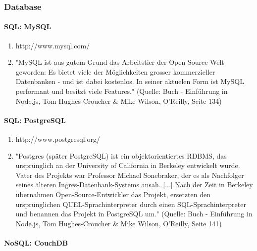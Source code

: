 


\subsubsection{Database}


\paragraph{SQL: MySQL}

\begin{enumerate}
\item http://www.mysql.com/
\item "MySQL ist aus gutem Grund das Arbeitstier der Open-Source-Welt geworden: Es bietet viele der M\"oglichkeiten grosser kommerzieller Datenbanken - und ist dabei kostenlos. In seiner aktuelen Form ist MySQL performant und besitzt viele Features." \cite{hughes2012einfuhrung} (Quelle: Buch - Einf\"uhrung in Node.js, Tom Hughes-Croucher \& Mike Wilson, O'Reilly, Seite 134)
\end{enumerate}


\paragraph{SQL: PostgreSQL}

\begin{enumerate}
\item http://www.postgresql.org/
\item "Postgres (sp\"ater PostgreSQL) ist ein objektorientiertes RDBMS, das urspr\"unglich an der University of California in Berkeley entwickelt wurde. Vater des Projekts war Professor Michael Sonebraker, der es als Nachfolger seines \"alteren Ingres-Datenbank-Systems ansah. [...] Nach der Zeit in Berkeley übernahmen Open-Source-Entwickler das Projekt, ersetzten den ursprünglichen QUEL-Sprachinterpreter durch einen SQL-Sprachinterpreter und benannen das Projekt in PostgreSQL um." \cite{hughes2012einfuhrung} (Quelle: Buch - Einf\"uhrung in Node.js, Tom Hughes-Croucher \& Mike Wilson, O'Reilly, Seite 141)
\end{enumerate}


\paragraph{NoSQL: CouchDB}

